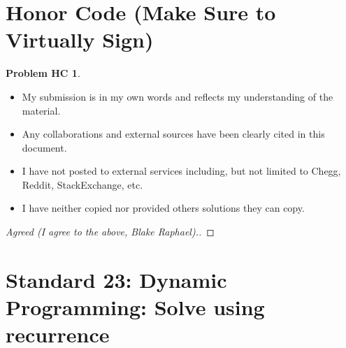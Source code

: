 \documentclass[11pt]{article}
\theoremstyle{definition}
\theoremstyle{definition}
\newtheorem*{requiredHC}{Problem HC}
\theoremstyle{definition}
\begin{document}
\newpage
\section*{Honor Code (Make Sure to Virtually Sign)} \label{HonorCode}
\hypertarget{HonorCode}{}

\begin{requiredHC}
\begin{itemize}
\item My submission is in my own words and reflects my understanding of the material.
\item Any collaborations and external sources have been clearly cited in this document.
\item I have not posted to external services including, but not limited to Chegg, Reddit, StackExchange, etc.
\item I have neither copied nor provided others solutions they can copy.
\end{itemize}

\end{requiredHC}

\begin{proof}[Agreed (I agree to the above, Blake Raphael).]
\end{proof}


\newpage
\setcounter{section}{22}
\section{Standard 23: Dynamic Programming: Solve using recurrence}
\end{document}
